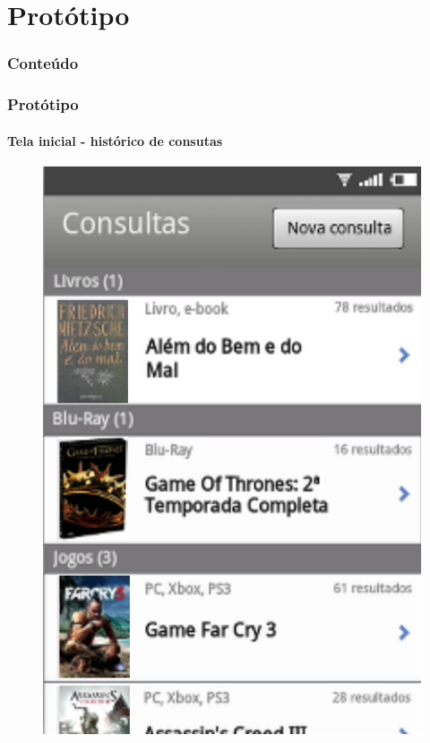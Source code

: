 \documentclass[14pt,beamer]{beamer}
\begin{document}
\section{Protótipo}

\begin{frame}
	\frametitle{Conteúdo}
    \begin{multicols}{2}
        \small
    \end{multicols}
\end{frame}

\begin{frame}
	\frametitle{Protótipo}
	\framesubtitle{Tela inicial - histórico de consutas}

    \vspace{-5px}
    \begin{figure}
        \centering
        \includegraphics[scale=.71]{tela/TelaHistorico}
    \end{figure}
\end{frame}
\end{document}
